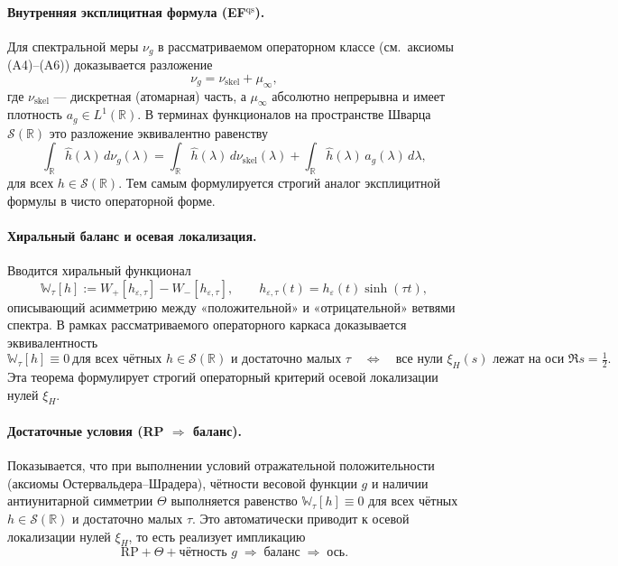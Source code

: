 \documentclass{article}
\numberwithin{equation}{section}
\theoremstyle{plain}
\theoremstyle{definition}
\theoremstyle{remark}
\def\Rightarrow{⇒}%
\def\infty{∞}\def\partial{∂}\def\sum{Σ}\def\int{∫}%
\begin{document}
\paragraph{Внутренняя эксплицитная формула (EF$^{\mathrm{qs}}$).}
Для спектральной меры $\nu_g$ в рассматриваемом операторном классе
(см.~аксиомы (A4)–(A6)) доказывается разложение
\begin{equation}
\nu_g=\nu_{\mathrm{skel}}+\mu_\infty,
\label{eq:QSSC0007}
\end{equation}
где $\nu_{\mathrm{skel}}$ — дискретная (атомарная) часть,
а $\mu_\infty$ абсолютно непрерывна и имеет плотность $a_g\in L^1(\mathbb R)$.
В терминах функционалов на пространстве Шварца $\mathcal S(\mathbb R)$
это разложение эквивалентно равенству
\begin{equation}
\int_{\mathbb R}\widehat h(\lambda)\,d\nu_g(\lambda)
=
\int_{\mathbb R}\widehat h(\lambda)\,d\nu_{\mathrm{skel}}(\lambda)
+
\int_{\mathbb R}\widehat h(\lambda)\,a_g(\lambda)\,d\lambda,
\label{eq:QSSC0008}
\end{equation}
для всех $h\in\mathcal S(\mathbb R)$.
Тем самым формулируется строгий аналог эксплицитной формулы
в чисто операторной форме.

\paragraph{Хиральный баланс и осевая локализация.}
Вводится хиральный функционал
\begin{equation}
\mathbb W_\tau[h]
:=W_+[h_{\varepsilon,\tau}]-W_-[h_{\varepsilon,\tau}],
\qquad h_{\varepsilon,\tau}(t)=h_\varepsilon(t)\sinh(\tau t),
\label{eq:QSSC0009}
\end{equation}
описывающий асимметрию между «положительной» и «отрицательной» ветвями спектра.
В рамках рассматриваемого операторного каркаса доказывается эквивалентность
\begin{equation}
\mathbb W_\tau[h]\equiv 0
\ \text{для всех чётных } h\in\mathcal S(\mathbb R)
\text{ и достаточно малых } \tau
\quad\Longleftrightarrow\quad
\text{все нули }\xi_H(s)\text{ лежат на оси }\Re s=\tfrac12.
\label{eq:QSSC0010}
\end{equation}
Эта теорема формулирует строгий операторный критерий осевой локализации
нулей $\xi_H$.


\paragraph{Достаточные условия (RP $\Rightarrow$ баланс).}
Показывается, что при выполнении условий отражательной положительности
(аксиомы Остервальдера–Шрадера), чётности весовой функции $g$
и наличии антиунитарной симметрии $\Theta$ выполняется равенство
$\mathbb W_\tau[h]\equiv0$ для всех чётных $h\in\mathcal S(\mathbb R)$
и достаточно малых $\tau$.
Это автоматически приводит к осевой локализации нулей $\xi_H$,
то есть реализует импликацию
\[
\text{RP}+\Theta+\text{чётность }g \;\Rightarrow\; \text{баланс} \;\Rightarrow\; \text{ось}.
\]
\end{document}
